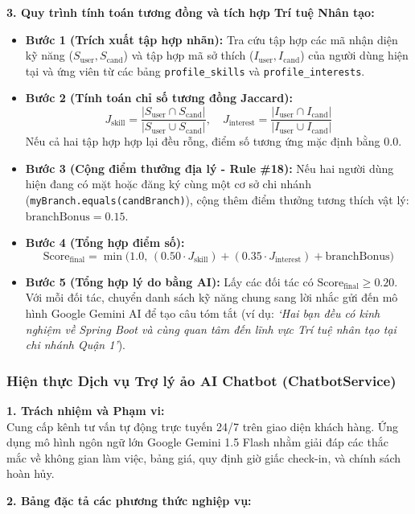\noindent\textbf{3. Quy trình tính toán tương đồng và tích hợp Trí tuệ Nhân tạo:}
\begin{itemize}
    \item \textbf{Bước 1 (Trích xuất tập hợp nhãn):} Tra cứu tập hợp các mã nhận diện kỹ năng ($S_{\text{user}}, S_{\text{cand}}$) và tập hợp mã sở thích ($I_{\text{user}}, I_{\text{cand}}$) của người dùng hiện tại và ứng viên từ các bảng \texttt{profile\_skills} và \texttt{profile\_interests}.
    \item \textbf{Bước 2 (Tính toán chỉ số tương đồng Jaccard):}
    $$J_{\text{skill}} = \frac{|S_{\text{user}} \cap S_{\text{cand}}|}{|S_{\text{user}} \cup S_{\text{cand}}|}, \quad J_{\text{interest}} = \frac{|I_{\text{user}} \cap I_{\text{cand}}|}{|I_{\text{user}} \cup I_{\text{cand}}|}$$
    Nếu cả hai tập hợp hợp lại đều rỗng, điểm số tương ứng mặc định bằng $0.0$.
    \item \textbf{Bước 3 (Cộng điểm thưởng địa lý - Rule \#18):} Nếu hai người dùng hiện đang có mặt hoặc đăng ký cùng một cơ sở chi nhánh (\texttt{myBranch.equals(candBranch)}), cộng thêm điểm thưởng tương thích vật lý: $\text{branchBonus} = 0.15$.
    \item \textbf{Bước 4 (Tổng hợp điểm số):}
    $$\text{Score}_{\text{final}} = \min\Big(1.0, \, (0.50 \cdot J_{\text{skill}}) + (0.35 \cdot J_{\text{interest}}) + \text{branchBonus}\Big)$$
    \item \textbf{Bước 5 (Tổng hợp lý do bằng AI):} Lấy các đối tác có $\text{Score}_{\text{final}} \ge 0.20$. Với mỗi đối tác, chuyển danh sách kỹ năng chung sang lời nhắc gửi đến mô hình Google Gemini AI để tạo câu tóm tắt (ví dụ: \textit{`Hai bạn đều có kinh nghiệm về Spring Boot và cùng quan tâm đến lĩnh vực Trí tuệ nhân tạo tại chi nhánh Quận 1'}).
\end{itemize}

\subsubsection{Hiện thực Dịch vụ Trợ lý ảo AI Chatbot (ChatbotService)}

\noindent\textbf{1. Trách nhiệm và Phạm vi:}\\
Cung cấp kênh tư vấn tự động trực tuyến 24/7 trên giao diện khách hàng. Ứng dụng mô hình ngôn ngữ lớn Google Gemini 1.5 Flash nhằm giải đáp các thắc mắc về không gian làm việc, bảng giá, quy định giờ giấc check-in, và chính sách hoàn hủy.

\noindent\textbf{2. Bảng đặc tả các phương thức nghiệp vụ:}

